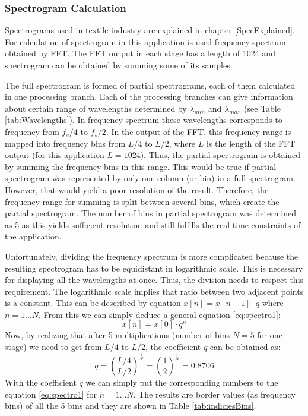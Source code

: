 \documentclass[twoside]{ctuthesis}
\theoremstyle{plain}
\theoremstyle{definition}
\theoremstyle{note}
\begin{document}
\subsubsection{Spectrogram Calculation}
Spectrograms used in textile industry are explained in chapter \ref{SpecExplained}. For calculation of spectrogram in this application is used frequency spectrum obtained by FFT. The FFT output in each stage has a length of 1024 and spectrogram can be obtained by summing some of its samples. 

The full spectrogram is formed of partial spectrograms, each of them calculated in one processing branch. Each of the processing branches can give information about certain range of wavelengths determined by $\lambda_{min}$ and $\lambda_{max}$ (see Table \ref{tab:Wavelengths}). In frequency spectrum these wavelengths corresponds to frequency from $f_s/4$ to $f_s/2$. In the output of the FFT, this frequency range is mapped into frequency bins from $L/4$ to $L/2$, where $L$ is the length of the FFT output (for this application $L=1024$). Thus, the partial spectrogram is obtained by summing the frequency bins in this range. 
This would be true if partial spectrogram was represented by only one column (or bin) in a full spectrogram. However, that would yield a poor resolution of the result. Therefore, the frequency range for summing is split between several bins, which create the partial spectrogram. The number of bins in partial spectrogram was determined as 5 as this yields sufficient resolution and still fulfills the real-time constraints of the application. 

Unfortunately, dividing the frequency spectrum is more complicated because the resulting spectrogram has to be equidistant in logarithmic scale. This is necessary for displaying all the wavelengths at once. Thus, the division needs to respect this requirement. The logarithmic scale implies that ratio between two adjacent points is a constant. This can be described by equation $x[n]=x[n-1]\cdot q$ where $n=1\ldots N$.
From this we can simply deduce a general equation \ref{eq:spectro1}:
\begin{equation} \label{eq:spectro1}
	x[n]=x[0]\cdot q^n
\end{equation}
Now, by realizing that after 5 multiplications (number of bins $N=5$ for one stage) we need to get from $L/4$ to $L/2$, the coefficient $q$ can be obtained as:
\begin{equation} \label{eq:spectro2}
	q={\left(\frac{L/4}{L/2}\right)}^{\frac{1}{N}}={\left(\frac{1}{2}\right)}^{\frac{1}{N}}=0.8706
\end{equation}
With the coefficient $q$ we can simply put the corresponding numbers to the equation \ref{eq:spectro1} for $n=1\ldots N$. The results are border values (as frequency bins) of all the 5 bins and they are shown in Table \ref{tab:indiciesBins}.
\end{document}
